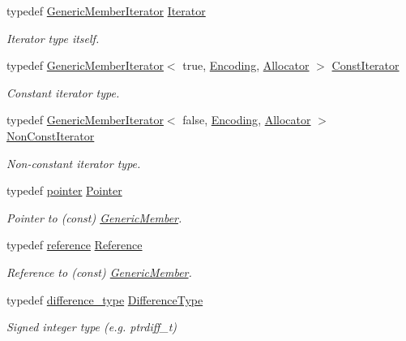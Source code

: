 \begin{DoxyCompactItemize}
\item 
typedef \mbox{\hyperlink{classrapidjson_1_1_generic_member_iterator}{Generic\+Member\+Iterator}} \mbox{\hyperlink{classrapidjson_1_1_generic_member_iterator_a37091c3dd8470486ef5188f3c1108653}{Iterator}}
\begin{DoxyCompactList}\small\item\em Iterator type itself. \end{DoxyCompactList}\item 
typedef \mbox{\hyperlink{classrapidjson_1_1_generic_member_iterator}{Generic\+Member\+Iterator}}$<$ true, \mbox{\hyperlink{classrapidjson_1_1_encoding}{Encoding}}, \mbox{\hyperlink{classrapidjson_1_1_allocator}{Allocator}} $>$ \mbox{\hyperlink{classrapidjson_1_1_generic_member_iterator_a61b9a9ba8a5917d90406532f104605cc}{Const\+Iterator}}
\begin{DoxyCompactList}\small\item\em Constant iterator type. \end{DoxyCompactList}\item 
typedef \mbox{\hyperlink{classrapidjson_1_1_generic_member_iterator}{Generic\+Member\+Iterator}}$<$ false, \mbox{\hyperlink{classrapidjson_1_1_encoding}{Encoding}}, \mbox{\hyperlink{classrapidjson_1_1_allocator}{Allocator}} $>$ \mbox{\hyperlink{classrapidjson_1_1_generic_member_iterator_a1a91868fa388664bb301061e3e24badb}{Non\+Const\+Iterator}}
\begin{DoxyCompactList}\small\item\em Non-\/constant iterator type. \end{DoxyCompactList}\item 
typedef \mbox{\hyperlink{classrapidjson_1_1_generic_member_iterator_a72c5c50dc9df5622b0be822dad59e372}{pointer}} \mbox{\hyperlink{classrapidjson_1_1_generic_member_iterator_aa9d53504374c7c6bdf46775482c5b107}{Pointer}}
\begin{DoxyCompactList}\small\item\em Pointer to (const) \mbox{\hyperlink{structrapidjson_1_1_generic_member}{Generic\+Member}}. \end{DoxyCompactList}\item 
typedef \mbox{\hyperlink{classrapidjson_1_1_generic_member_iterator_ab7d2d79f74f084b9b5abd42ef891536d}{reference}} \mbox{\hyperlink{classrapidjson_1_1_generic_member_iterator_abe27838f8dc71fdb38028ef27ae0b4f2}{Reference}}
\begin{DoxyCompactList}\small\item\em Reference to (const) \mbox{\hyperlink{structrapidjson_1_1_generic_member}{Generic\+Member}}. \end{DoxyCompactList}\item 
typedef \mbox{\hyperlink{classrapidjson_1_1_generic_member_iterator_a2a981caecbc8b48968bccd6c3fa7513d}{difference\+\_\+type}} \mbox{\hyperlink{classrapidjson_1_1_generic_member_iterator_aff2739a9265639a7a4be8c3e6216b31a}{Difference\+Type}}
\begin{DoxyCompactList}\small\item\em Signed integer type (e.\+g. {\ttfamily ptrdiff\+\_\+t}) \end{DoxyCompactList}\end{DoxyCompactItemize}
